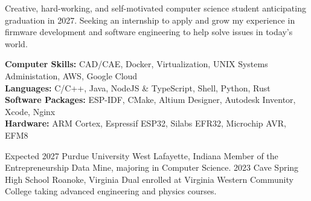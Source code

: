 \documentclass[9pt]{developercv} %
\begin{document}
\vspace{0.5cm}



\begin{minipage}[t]{1\textwidth} %
	\vspace{-\baselineskip} %
	Creative, hard-working, and self-motivated computer science student anticipating graduation in 2027. Seeking an internship to apply and grow my experience in firmware development and software engineering to help solve issues in today's world.
\end{minipage}

\vspace{0.5cm}


\begin{minipage}[t]{1\textwidth} %
	\vspace{-\baselineskip} %
	\textbf{Computer Skills:} CAD/CAE, Docker, Virtualization, UNIX Systems Administation, AWS, Google Cloud\\
	\textbf{Languages:} C/C++, Java, NodeJS \& TypeScript, Shell, Python, Rust\\
	\textbf{Software Packages:} ESP-IDF, CMake, Altium Designer, Autodesk Inventor, Xcode, Nginx\\
	\textbf{Hardware:} ARM Cortex, Espressif ESP32, Silabs EFR32, Microchip AVR, EFM8\\
\end{minipage}

\vspace{0.5cm}



\begin{entrylist}
	\entry
		{Expected 2027}
		{Purdue University}
		{West Lafayette, Indiana}
		{Member of the Entrepreneurship Data Mine, majoring in Computer Science. }
	\entry
		{2023}
		{Cave Spring High School}
		{Roanoke, Virginia}
		{Dual enrolled at Virginia Western Community College taking advanced engineering and physics courses.}
\end{entrylist}
\end{document}
